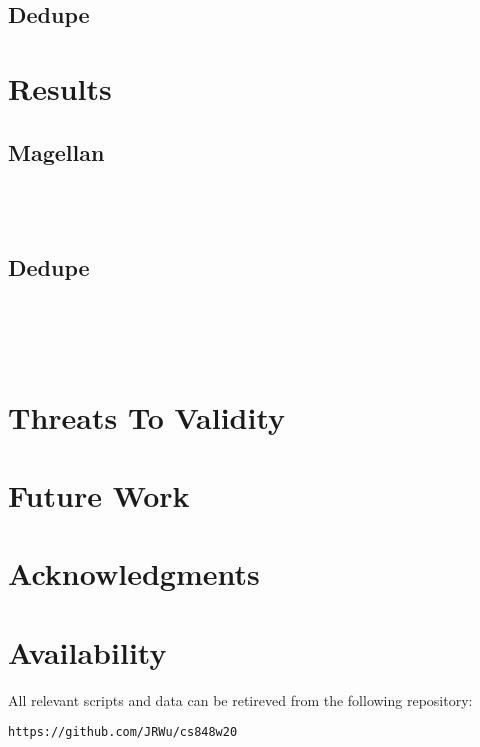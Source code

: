 \documentclass[letterpaper,twocolumn,10pt]{article}
\begin{document}
\subsection{Dedupe}



\section{Results}
\subsection{Magellan}


\noindent{}
\\\\



\subsection{Dedupe}
\\

\noindent{}
\\\\




\section{Threats To Validity}


\section{Future Work}


\section{Acknowledgments}


\section{Availability}\label{Availability}
All relevant scripts and data can be retireved from the following repository:
\begin{center}
{\tt https://github.com/JRWu/cs848w20}
\end{center}

{\footnotesize 

\theendnotes

\newpage
}
\end{document}
